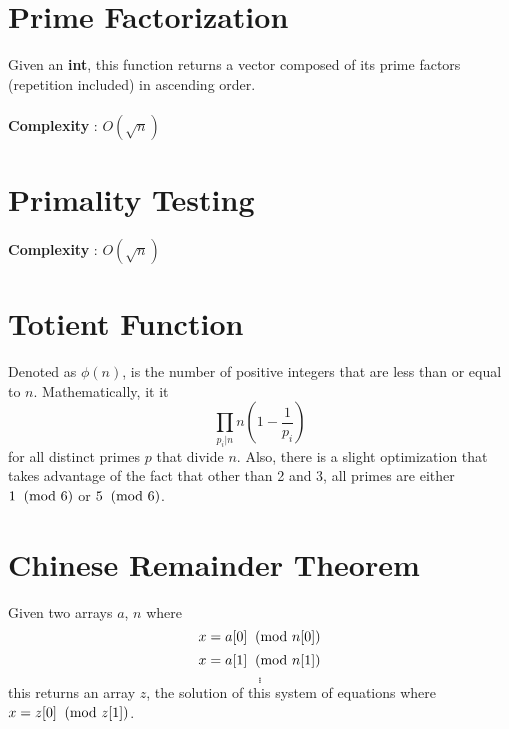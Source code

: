 	\section{Prime Factorization}
	
	Given an {\bf int}, this function returns a vector composed of its prime 
	factors (repetition included) in ascending order. \\
	\ \\
	{\bf Complexity} : $O(\sqrt{n})$ \\
	
	
	
	\section{Primality Testing}
	{\bf Complexity} : $O(\sqrt{n})$ \\
	
	
	
	\section{Totient Function}
	
	Denoted as $\phi(n)$, is the number of positive integers that are less than 
	or equal to $n$. Mathematically, it it $$\prod_{p_i | n}^{}n\left(1-\frac{1}{p_i}\right)$$
	for all distinct primes $p$ that divide $n$. Also, there is a slight 
	optimization that takes advantage of the fact that other than 2 and 3, all 
	primes are either $1 \imod{6}$ or $5 \imod{6}$.
	
	
	\section{Chinese Remainder Theorem}
	
	Given two arrays $a$, $n$ where 
	$$x = a[0] \imod{n[0]}$$
	$$x = a[1] \imod{n[1]}$$
	$$.$$
	$$.$$
	$$.$$
	this returns an array $z$, the solution of this system of equations where
	$x = z[0] \imod{z[1]}$.
	
